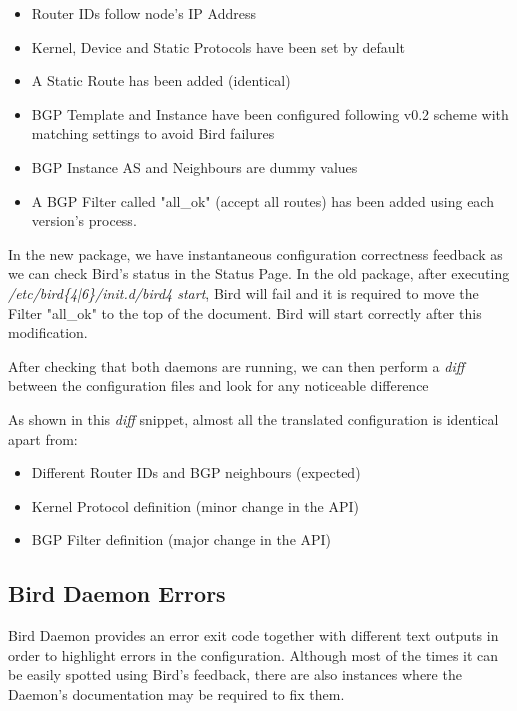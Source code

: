 \begin{itemize}
\item Router IDs follow node's IP Address
\item Kernel, Device and Static Protocols have been set by default
\item A Static Route has been added  (identical)
\item BGP Template and Instance have been configured following v0.2 scheme with matching settings to avoid Bird failures
\item BGP Instance AS and Neighbours are dummy values
\item A BGP Filter called "all\_ok" (accept all routes) has been added using each version's process.
\end{itemize}

In the new package, we have instantaneous configuration correctness feedback as we can check Bird's status in the Status Page. 
In the old package, after executing \textit{/etc/bird\{4|6\}/init.d/bird4 start}, Bird will fail and it is required to move the Filter "all\_ok" to the top of the document. Bird will start correctly after this modification.

After checking that both daemons are running, we can then perform a \textit{diff} between the configuration files and look for any noticeable difference



As shown in this \textit{diff} snippet, almost all the translated configuration is identical apart from:

\begin{itemize}
\item Different Router IDs and BGP neighbours (expected)
\item Kernel Protocol definition (minor change in the API)
\item BGP Filter definition (major change in the API)
\end{itemize}

\subsection{Bird Daemon Errors}
Bird Daemon provides an error exit code together with different text outputs in order to highlight errors in the configuration. Although most of the times it can be easily spotted using Bird's feedback, there are also instances where the Daemon's documentation may be required to fix them.

